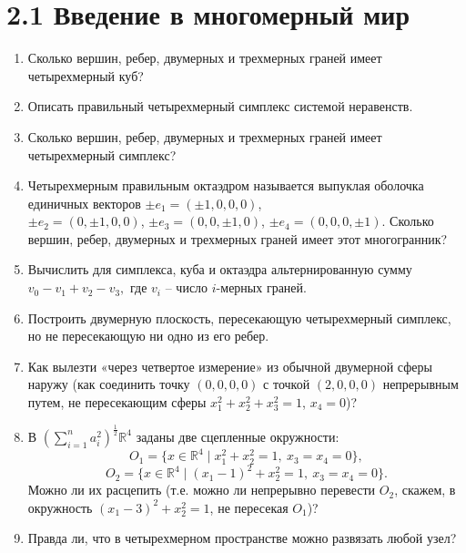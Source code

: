 % 

% 

	\section{2.1 Введение в многомерный мир}

	\begin{enumerate}
		\item Сколько вершин, ребер, двумерных и трехмерных граней имеет четырехмерный куб?

		\item Описать правильный четырехмерный симплекс системой неравенств.

		\item Сколько вершин, ребер, двумерных и трехмерных граней имеет четырехмерный симплекс?

		\item Четырехмерным правильным октаэдром называется выпуклая оболочка единичных векторов $\pm e_1 = (\pm 1, 0, 0, 0)$, \\ 
		$\pm e_2 = (0, \pm 1, 0, 0)$, 
		$\pm e_3 = (0, 0, \pm 1, 0)$, 
		$\pm e_4 = (0, 0, 0, \pm 1)$. Сколько вершин, ребер, двумерных и трехмерных граней имеет этот многогранник?

		\item Вычислить для симплекса, куба и октаэдра альтернированную сумму $v_0 - v_1 + v_2 - v_3,$ где $v_i$ -- число $i$-мерных граней.

		\item Построить двумерную плоскость, пересекающую четырехмерный симплекс, 
		но не пересекающую ни одно из его ребер.

		\item Как вылезти «через четвертое измерение» из обычной двумерной сферы наружу 
		(как соединить точку $(0,0,0,0)$ с точкой $(2,0,0,0)$ непрерывным путем, 
		не пересекающим сферы $x_1^2 + x_2^2 + x_3^2 = 1$, $x_4 = 0$)?

		\item В $\left(\sum\limits_{i = 1}^n a_i^2 \right)^\frac{1}{2}\mathbb{R}^4$ заданы две сцепленные окружности:
		\[
			O_1 = \{ x \in \mathbb{R}^4 \mid x_1^2 + x_2^2 = 1,\ x_3 = x_4 = 0 \},
		\]
		\[
			O_2 = \{ x \in \mathbb{R}^4 \mid (x_1 - 1)^2 + x_2^2 = 1,\ x_3 = x_4 = 0 \}.
		\]
		Можно ли их расцепить (т.е. можно ли непрерывно перевести $O_2$, скажем, в окружность 
		$(x_1 - 3)^2 + x_2^2 = 1$, не пересекая $O_1$)?

		\item Правда ли, что в четырехмерном пространстве можно развязать любой узел?


\end{enumerate}
